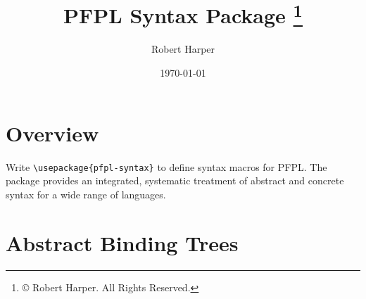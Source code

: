 \documentclass[11pt]{article}
\title{\textsf{PFPL} Syntax Package%
\footnote{\copyright{} \the\year{} Robert Harper.  All Rights Reserved.}}
\author{Robert Harper}
\date{\today}
\begin{document}
\maketitle{}

\section*{Overview}

Write \verb|\usepackage{pfpl-syntax}| to define syntax macros for \textsf{PFPL}.  The package provides an integrated, systematic treatment of abstract and concrete syntax for a wide range of languages.

\section*{Abstract Binding Trees}
\end{document}

